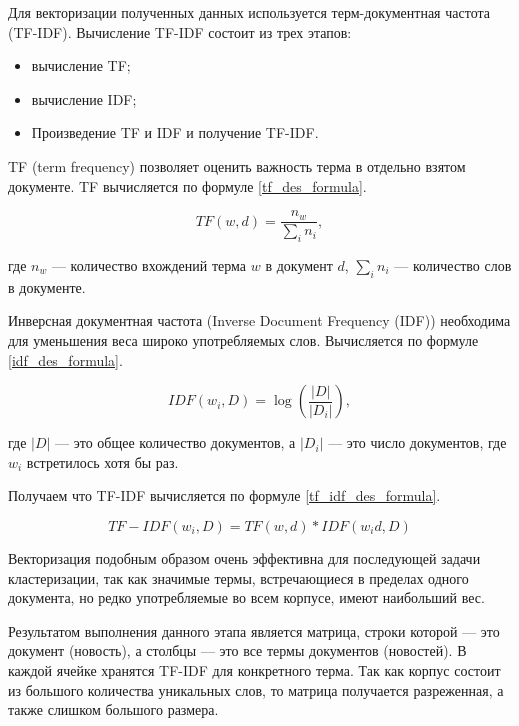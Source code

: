 Для векторизации полученных данных используется терм-документная частота (TF-IDF). Вычисление TF-IDF состоит из трех этапов:

\begin{itemize}
	\item вычисление TF;
	\item вычисление IDF;
	\item Произведение TF и IDF и получение TF-IDF.
\end{itemize}

TF (term frequency) позволяет оценить важность терма в отдельно взятом документе. TF вычисляется по формуле \ref{tf_des_formula}.

\begin{equation}
\label{tf_des_formula}
TF(w, d) = \frac{n_w}{\sum_{i}n_i},
\end{equation}

где $n_w$ --- количество вхождений терма $w$ в документ $d$, $\sum_{i}n_i$ --- количество слов в документе.

Инверсная документная частота (Inverse Document Frequency (IDF)) необходима для уменьшения веса широко употребляемых слов. Вычисляется по формуле \ref{idf_des_formula}.

\begin{equation}
\label{idf_des_formula}
IDF(w_i, D) = \log{(\frac{|D|}{|D_i|})},
\end{equation}
	
где $|D|$ --- это общее количество документов, а $|D_i|$ --- это число документов, где $w_i$ встретилось хотя бы раз.

Получаем что TF-IDF вычисляется по формуле \ref{tf_idf_des_formula}.

\begin{equation}
\label{tf_idf_des_formula}
TF-IDF(w_i, D) = TF(w, d) * IDF(w_id, D)
\end{equation}

Векторизация подобным образом очень эффективна для последующей задачи кластеризации, так как значимые термы, встречающиеся в пределах одного документа, но редко употребляемые во всем корпусе, имеют наибольший вес.

Результатом выполнения данного этапа является матрица, строки которой --- это документ (новость), а столбцы --- это все термы документов (новостей). В каждой ячейке хранятся TF-IDF для конкретного терма. Так как корпус состоит из большого количества уникальных слов, то матрица получается разреженная, а также слишком большого размера.

